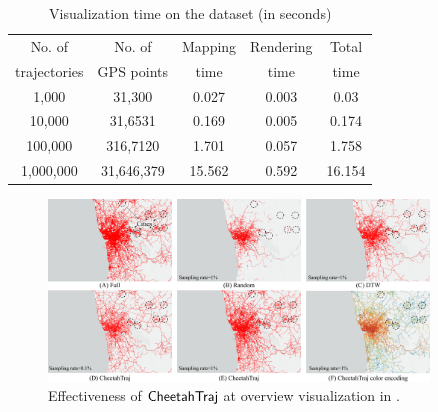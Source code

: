 \begin{table}
	\centering
	\small
	\caption{Visualization time on the \pt{} dataset (in seconds)}
    \trim
	\begin{tabular}{|c|c|c|c|c|} \hline
		No. of  & No. of & Mapping & Rendering & Total \\
         trajectories &  GPS points & time & time & time \\ \hline
		1,000& 31,300 & 0.027 & 0.003 & 0.03 \\ \hline
		10,000& 31,6531 & 0.169 & 0.005 & 0.174\\ \hline
		100,000& 316,7120 & 1.701 & 0.057 & 1.758 \\ \hline
		1,000,000& 31,646,379 & 15.562 & 0.592 & 16.154 \\ \hline
	\end{tabular}	\label{tab:gpu}
    \trim \trim 
\end{table}

\begin{figure}[t]
	\centering
	\includegraphics[width=0.90\textwidth]{pictures/case_study_icde/case_study_overview.pdf}
	\trim
	\caption{Effectiveness of $\mathsf{CheetahTraj}$ at overview visualization in \pt{}.}
	\label{fig:overview}
	\trim \trim
\end{figure}

